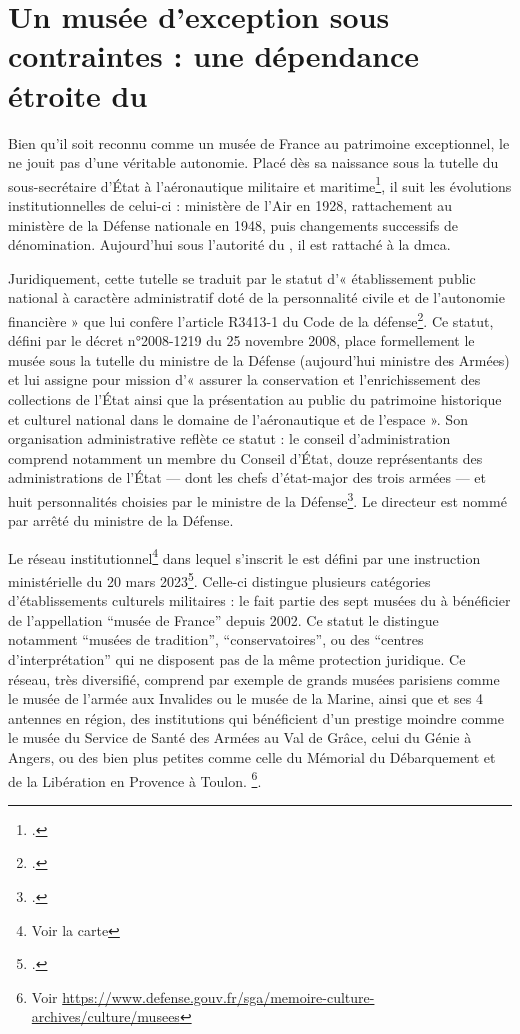 \section{\label{I-B-1}Un musée d'exception sous contraintes : une dépendance étroite du \minarm}

Bien qu'il soit reconnu comme un musée de France au patrimoine exceptionnel, le \mae ne jouit pas d'une véritable autonomie. Placé dès sa naissance sous la tutelle du sous-secrétaire d'État à l'aéronautique militaire et maritime\footcite{terrierAeroportParisBourget2019}, il suit les évolutions institutionnelles de celui-ci : ministère de l'Air en 1928, rattachement au ministère de la Défense nationale en 1948, puis changements successifs de dénomination. Aujourd'hui sous l'autorité du \minarm, il est rattaché à la \gls{dmca}.

Juridiquement, cette tutelle se traduit par le statut d'« établissement public national à caractère administratif doté de la personnalité civile et de l'autonomie financière » que lui confère l'article R3413-1 du Code de la défense\footcite{ArticleR34131Code2008}. Ce statut, défini par le décret n°2008-1219 du 25 novembre 2008, place formellement le musée sous la tutelle du ministre de la Défense (aujourd'hui ministre des Armées) et lui assigne pour mission d'« assurer la conservation et l'enrichissement des collections de l'État ainsi que la présentation au public du patrimoine historique et culturel national dans le domaine de l'aéronautique et de l'espace ». Son organisation administrative reflète ce statut : le conseil d'administration comprend notamment un membre du Conseil d'État, douze représentants des administrations de l'État — dont les chefs d'état-major des trois armées — et huit personnalités choisies par le ministre de la Défense\footcite{ArticleR341373Code2013}. Le directeur est nommé par arrêté du ministre de la Défense.

Le réseau institutionnel\footnote{Voir la carte } dans lequel s'inscrit le \mae est défini par une instruction ministérielle du 20 mars 2023\footcite{ministeredesarmeesInstructionNdeg303ARM2023}.
Celle-ci distingue plusieurs catégories d'établissements culturels militaires : le \mae fait partie des sept musées du \minarm à bénéficier de l'appellation \enquote{musée de France} depuis 2002. Ce statut le distingue notamment \enquote{musées de tradition}, \enquote{conservatoires}, ou des \enquote{centres d'interprétation} qui ne disposent pas de la même protection juridique. Ce réseau, très diversifié, comprend par exemple de grands musées parisiens comme le musée de l'armée aux Invalides ou le musée de la Marine, ainsi que et ses 4 antennes en région, des institutions qui bénéficient d'un prestige moindre comme le musée du Service de Santé des Armées au Val de Grâce, celui du Génie à Angers, ou des bien plus petites comme celle du Mémorial du Débarquement et de la Libération en Provence à Toulon.
\footnote{Voir \url{https://www.defense.gouv.fr/sga/memoire-culture-archives/culture/musees}}.


